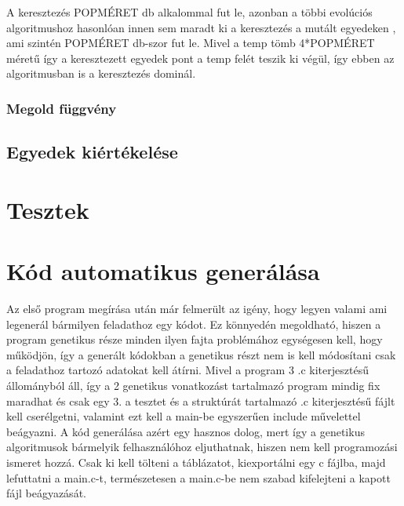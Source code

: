 \documentclass[12ppt,a4paper,oneside]{report}
\begin{document}
            
            {A keresztezés POPMÉRET db alkalommal fut le, azonban a többi evolúciós algoritmushoz hasonlóan innen sem maradt ki a keresztezés a mutált egyedeken , ami szintén POPMÉRET db-szor fut le. Mivel a temp tömb 4*POPMÉRET méretű így a keresztezett egyedek pont a temp felét teszik ki végül, így ebben az algoritmusban is a keresztezés dominál.}

        \subsection{Megold függvény} %

    \section{Egyedek kiértékelése} %

\chapter{Tesztek} %

\chapter{Kód automatikus generálása} %
    {Az első program megírása után már felmerült az igény, hogy legyen valami ami legenerál bármilyen feladathoz egy kódot. Ez könnyedén megoldható, hiszen a program genetikus része minden ilyen fajta problémához egységesen kell, hogy működjön, így a generált kódokban a genetikus részt nem is kell módosítani csak a feladathoz tartozó adatokat kell átírni. Mivel a program 3 .c kiterjesztésű állományból áll, így a 2 genetikus vonatkozást tartalmazó program mindig fix maradhat és csak egy 3. a tesztet és a struktúrát tartalmazó .c kiterjesztésű fájlt kell cserélgetni, valamint ezt kell a main-be egyszerűen include művelettel beágyazni. A kód generálása azért egy hasznos dolog, mert így a genetikus algoritmusok bármelyik felhasználóhoz eljuthatnak, hiszen nem kell programozási ismeret hozzá. Csak ki kell tölteni a táblázatot, kiexportálni egy c fájlba, majd lefuttatni a main.c-t, természetesen a main.c-be nem szabad kifelejteni a kapott fájl beágyazását.}
    
\end{document}
